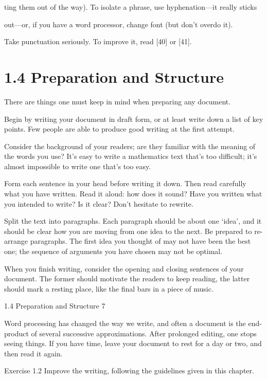 \documentclass[11pt]{article}
\theoremstyle{plain}
\theoremstyle{definition}
\begin{document}
ting them out of the way). To isolate a phrase, use hyphenation---it really sticks

out---or, if you have a word processor, change font (but don't overdo it).

\textbullet{} Take punctuation seriously. To improve it, read [40] or [41].

\section{1.4 Preparation and Structure}

There are things one must keep in mind when preparing any document.

\textbullet{} Begin by writing your document in draft form, or at least write down a list of key points. Few people are able to produce good writing at the first attempt.

\textbullet{} Consider the background of your readers; are they familiar with the meaning of the words you use? It's easy to write a mathematics text that's too difficult; it's almost impossible to write one that's too easy.

\textbullet{} Form each sentence in your head before writing it down. Then read carefully what you have written. Read it aloud: how does it sound? Have you written what you intended to write? Is it clear? Don't hesitate to rewrite.

\textbullet{} Split the text into paragraphs. Each paragraph should be about one `idea', and it should be clear how you are moving from one idea to the next. Be prepared to re-arrange paragraphs. The first idea you thought of may not have been the best one; the sequence of arguments you have chosen may not be optimal.

\textbullet{} When you finish writing, consider the opening and closing sentences of your document. The former should motivate the readers to keep reading, the latter should mark a resting place, like the final bars in a piece of music.

1.4 Preparation and Structure 7

\textbullet{} Word processing has changed the way we write, and often a document is the end-product of several successive approximations. After prolonged editing, one stops seeing things. If you have time, leave your document to rest for a day or two, and then read it again.

Exercise 1.2 Improve the writing, following the guidelines given in this chapter.
\end{document}
